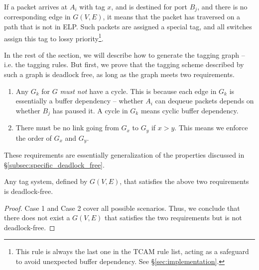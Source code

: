 If a packet arrives at $A_i$ with tag $x$, and is destined for port $B_j$, and
there is no corresponding edge in $G(V,E)$, it means that the packet has
traversed on a path that is not in ELP.  Such packets are assigned a special
tag, and all switches assign this tag to lossy priority\footnote{This rule is
always the last one in the TCAM rule list, acting as a safeguard to avoid
unexpected buffer dependency.  See \S\ref{sec:implementation}.}.

In the rest of the section, we will describe how to generate the tagging graph
-- i.e. the tagging rules. But first, we prove that the tagging scheme described
by such a graph is deadlock free, as long as the graph meets two requirements.

\begin{enumerate}

		\item  Any $G_k$ for $G$ {\em must not} have a cycle.  This is
				because each edge in $G_k$ is essentially a buffer dependency --
				whether $A_i$ can dequeue packets depends on whether $B_j$ has
				paused it. A cycle in $G_k$ means cyclic buffer
				dependency.
		\item There must be no link going from
				$G_x$ to $G_y$ if $x>y$.  This means we enforce the order of
				$G_x$ and $G_y$.
\end{enumerate}
These requirements are essentially generalization of the properties
discussed in \S\ref{subsec:specific_deadlock_free}.
\begin{theorem}
Any tag system, defined by $G(V,E)$, that satisfies the above two requirements is deadlock-free.
\end{theorem}

\begin{proof}




Case 1 and Case 2 cover all possible scenarios. Thus, we conclude that there does not exist a $G(V,E)$ that satisfies the two requirements but is not deadlock-free.
\end{proof}


